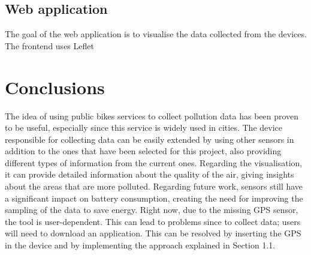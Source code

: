 \documentclass[12pt]{article}
\begin{document}
  \subsection{Web application}
  The goal of the web application is to visualise the data collected from the devices. The frontend uses Leflet 
  \newpage
  \section{Conclusions}
  The idea of using public bikes services to collect pollution data has been proven to be useful, especially since this service is widely used in cities. The device responsible for collecting data can be easily extended by using other sensors in addition to the ones that have been selected for this project, also providing different types of information from the current ones. Regarding the visualisation, it can provide detailed information about the quality of the air, giving insights about the areas that are more polluted. Regarding future work, sensors still have a significant impact on battery consumption, creating the need for improving the sampling of the data to save energy.  Right now, due to the missing GPS sensor, the tool is user-dependent. This can lead to problems since to collect data; users will need to download an application. This can be resolved by inserting the GPS in the device and by implementing the approach explained in Section 1.1.   
\end{document}
